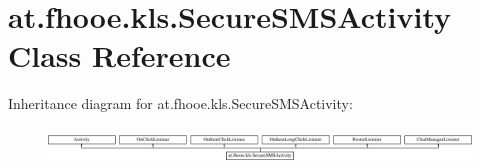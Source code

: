 \hypertarget{classat_1_1fhooe_1_1kls_1_1_secure_s_m_s_activity}{\section{at.\-fhooe.\-kls.\-Secure\-S\-M\-S\-Activity Class Reference}
\label{classat_1_1fhooe_1_1kls_1_1_secure_s_m_s_activity}
}
Inheritance diagram for at.\-fhooe.\-kls.\-Secure\-S\-M\-S\-Activity\-:\begin{figure}[H]
\begin{center}
\leavevmode
\includegraphics[height=0.938023cm]{classat_1_1fhooe_1_1kls_1_1_secure_s_m_s_activity}
\end{center}
\end{figure}
